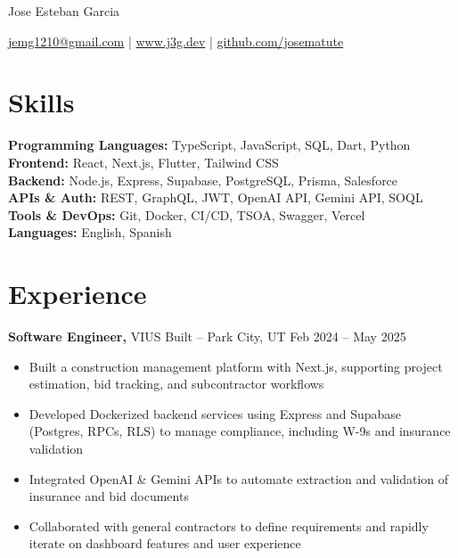 \documentclass[11pt]{article}       %
\begin{document}
\centerline{\Huge Jose Esteban Garcia}

\vspace{5pt}

\centerline{\href{mailto:jemg1210@gmail.com}{jemg1210@gmail.com} | \href{https://www.j3g.dev}{www.j3g.dev} | \href{https://github.com/josematute}{github.com/josematute}}

\vspace{-10pt}

\section*{Skills}
\textbf{Programming Languages:} TypeScript, JavaScript, SQL, Dart, Python \\
\textbf{Frontend:} React, Next.js, Flutter, Tailwind CSS \\
\textbf{Backend:} Node.js, Express, Supabase, PostgreSQL, Prisma, Salesforce \\
\textbf{APIs \& Auth:} REST, GraphQL, JWT, OpenAI API, Gemini API, SOQL \\
\textbf{Tools \& DevOps:} Git, Docker, CI/CD, TSOA, Swagger, Vercel \\
\textbf{Languages:} English, Spanish

\vspace{-6.5pt}

\section*{Experience}
\textbf{Software Engineer,} VIUS Built -- Park City, UT \hfill Feb 2024 -- May 2025 \\
\vspace{-9pt}
\begin{itemize}
  \item Built a construction management platform with Next.js, supporting project estimation, bid tracking, and subcontractor workflows
  \item Developed Dockerized backend services using Express and Supabase (Postgres, RPCs, RLS) to manage compliance, including W-9s and insurance validation
  \item Integrated OpenAI \& Gemini APIs to automate extraction and validation of insurance and bid documents
  \item Collaborated with general contractors to define requirements and rapidly iterate on dashboard features and user experience
\end{itemize}
\end{document}
